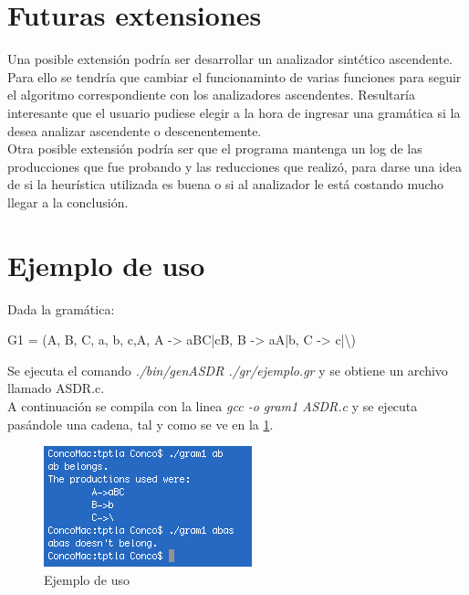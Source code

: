 \documentclass{article}
\begin{document}
\section{Futuras extensiones}
Una posible extensi\'on podr\'ia ser desarrollar un analizador sint\'ctico ascendente. Para ello se tendr\'ia que cambiar el funcionaminto de varias funciones para seguir el algoritmo correspondiente con los analizadores ascendentes. Resultar\'ia interesante que el usuario pudiese elegir a la hora de ingresar una gram\'atica si la desea analizar ascendente o descenentemente.\\
Otra posible extensi\'on podr\'ia ser que el programa mantenga un log de las producciones que fue probando y las reducciones que realiz\'o, para darse una idea de si la heur\'istica utilizada es buena o si al analizador le est\'a costando mucho llegar a la conclusi\'on.\\


\section{Ejemplo de uso}
Dada la gram\'atica:
\begin{center}
G1 = ({A, B, C}, {a, b, c},A, {A -> aBC|cB, B -> aA|b, C -> c|\textbackslash})
\end{center}
Se ejecuta el comando \textit{./bin/genASDR ./gr/ejemplo.gr} y se obtiene un archivo llamado ASDR.c.\\
A continuaci\'on se compila con la linea \textit{gcc -o gram1 ASDR.c} y se ejecuta pas\'andole una cadena, tal y como se ve en la \ref{fig:ejemplo}.
 
\begin{figure}[H]
\centering
\includegraphics[scale=1]{./fotos/ejemplo.png}
\caption{ Ejemplo de uso}
\label{fig:ejemplo}
\end{figure}
\end{document}
